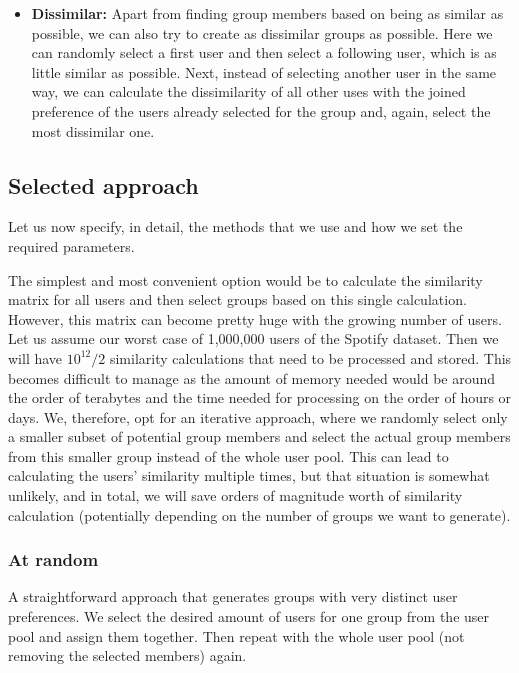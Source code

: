 \begin{itemize}
    \item \textbf{Dissimilar:}
        Apart from finding group members based on being as similar as possible, we can also try to create as dissimilar groups as possible. Here we can randomly select a first user and then select a following user, which is as little similar as possible. Next, instead of selecting another user in the same way, we can calculate the dissimilarity of all other uses with the joined preference of the users already selected for the group and, again, select the most dissimilar one.
\end{itemize}


\subsection{Selected approach}
Let us now specify, in detail, the methods that we use and how we set the required parameters.

The simplest and most convenient option would be to calculate the similarity matrix for all users and then select groups based on this single calculation. However, this matrix can become pretty huge with the growing number of users. Let us assume our worst case of 1,000,000 users of the Spotify dataset. Then we will have $10^{12}/2$ similarity calculations that need to be processed and stored. This becomes difficult to manage as the amount of memory needed would be around the order of terabytes and the time needed for processing on the order of hours or days. We, therefore, opt for an iterative approach, where we randomly select only a smaller subset of potential group members and select the actual group members from this smaller group instead of the whole user pool. This can lead to calculating the users' similarity multiple times, but that situation is somewhat unlikely, and in total, we will save orders of magnitude worth of similarity calculation (potentially depending on the number of groups we want to generate).

\subsubsection{At random}
A straightforward approach that generates groups with very distinct user preferences. We select the desired amount of users for one group from the user pool and assign them together. Then repeat with the whole user pool (not removing the selected members) again.

